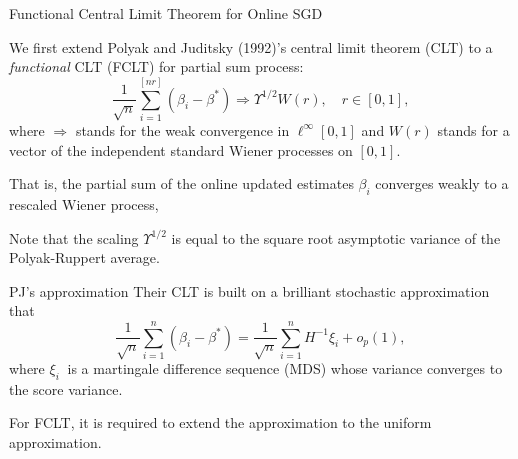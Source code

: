 \documentclass[beamer, t]{beamer}
\begin{document}
\begin{frame}{ Functional Central Limit Theorem for Online SGD}

We first  extend
Polyak and Juditsky (1992)'s central limit theorem (CLT) to a \emph{functional} CLT (FCLT) for partial sum process:
\begin{equation*}\label{eq4}
\frac{1}{\sqrt{n}}\sum_{i=1}^{\left[nr\right]}\left(\beta_{i}-\beta^{*}\right)\Rightarrow \Upsilon^{1/2}W\left(r\right),\quad r\in\left[0,1\right],
\end{equation*}
where $\Rightarrow$ stands for the weak convergence in $\ell^{\infty}\left[0,1\right]$
and $W\left(r\right)$ stands for a vector of the independent standard
Wiener processes on $\left[0,1\right]$.

\bigskip
That is, the partial sum of the online updated estimates $\beta_i$ converges weakly to a rescaled Wiener process,

\bigskip 
Note that the scaling $\Upsilon^{1/2}$ is equal to the square root  asymptotic variance of the Polyak-Ruppert average.

\end{frame}

\begin{frame}{PJ's approximation}
	Their CLT is built on a brilliant stochastic approximation that 
	\[  \frac{1}{\sqrt{n}}\sum_{i=1}^{n}\left(\beta_{i}-\beta^{*}\right) = \frac{1}{\sqrt{n}}\sum_{i=1}^{n}H^{-1}\xi_{i} + o_p (1),
	 \]
	 where $ \xi_{i}\ $ is a martingale difference sequence (MDS) whose variance converges to the score variance. 
	 \bigskip
	 
	 For FCLT, it is required to extend the approximation to the uniform approximation. 
\end{frame}
\end{document}
